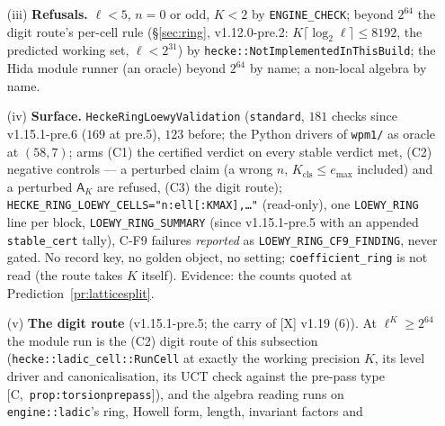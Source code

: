 \documentclass[11pt]{article}
\theoremstyle{remark}
\newcommand{\HA}[1]{[C,~\texttt{#1}]}      %
\begin{document}
\begin{enumerate}
  $\dim\mathsf A'_K/\ell$ (on $\ell^{t}$-scaled generators for a free part); (5) the criterion $\dim\mathsf A'_K/\ell=\lceil f/2\rceil$ ($f=0$ and
  $K\ge t$ for \texttt{torsion\_stable}); (6) $\varepsilon_K=\mathrm{level}\cdot\lceil f/2\rceil-\mathrm{length}(\mathsf A'_K)\ge0$ and, along the recorded
  levels, $\varepsilon^{\mathrm{sat}}$ non-decreasing (\HA{prop:satdefect}(2)). Each is compared with the route's reading; \emph{any} mismatch throws
  (\texttt{ENGINE\_CHECK}) --- the verdict is never silently downgraded. Every \texttt{LOEWY\_RING} line gains \emph{one} appended field,
  \texttt{stable\_cert=certified|reading|none} (\texttt{reading}: the certificate not run, \texttt{LoewyOptions::certify = false}; \texttt{none}: no stable
  verdict); the old text, \texttt{verdict=stable} included, is byte-identical.
\item[(iii)] \textbf{Refusals.} $\ell<5$, $n=0$ or odd, $K<2$ by \texttt{ENGINE\_CHECK}; beyond $2^{64}$ the digit route's per-cell rule
  (\S\ref{sec:ring}, v1.12.0-pre.2: $K\lceil\log_2\ell\rceil\le8192$, the predicted working set, $\ell<2^{31}$) by \texttt{hecke::NotImplementedInThisBuild};
  the Hida module runner (an oracle) beyond $2^{64}$ by name; a non-local algebra by name.
\item[(iv)] \textbf{Surface.} \texttt{HeckeRingLoewyValidation} (\texttt{standard}, $181$ checks since v1.15.1-pre.6 ($169$ at pre.5), $123$ before; the Python drivers of
  \texttt{wpm1/} as oracle at $(58,7)$; arms (C1) the certified verdict on every stable verdict met, (C2) negative controls --- a perturbed claim (a wrong $n$, $K_{\mathrm{cls}}\le e_{\max}$ included) and a
  perturbed $\mathsf A_K$ are refused, (C3) the digit route);
  \texttt{HECKE\_RING\_LOEWY\_CELLS="n:ell[:KMAX],\dots"} (read-only), one \texttt{LOEWY\_RING} line per block, \texttt{LOEWY\_RING\_SUMMARY} (since
  v1.15.1-pre.5 with an appended \texttt{stable\_cert} tally), C-F9 failures \emph{reported} as \texttt{LOEWY\_RING\_CF9\_FINDING}, never gated. No record
  key, no golden object, no setting; \texttt{coefficient\_ring} is not read (the route takes $K$ itself). Evidence: the counts quoted at
  Prediction~\ref{pr:latticesplit}.
\item[(v)] \textbf{The digit route} (v1.15.1-pre.5; the carry of [X] v1.19 (6)). At $\ell^{K}\ge2^{64}$ the module run is the (C2) digit route of this
  subsection (\texttt{hecke::ladic\_cell::RunCell} at exactly the working precision $K$, its level driver and canonicalisation, its UCT check against the
  pre-pass type \HA{prop:torsionprepass}), and the algebra reading runs on \texttt{engine::ladic}'s ring, Howell form, length, invariant factors and

\end{enumerate}
\end{document}
